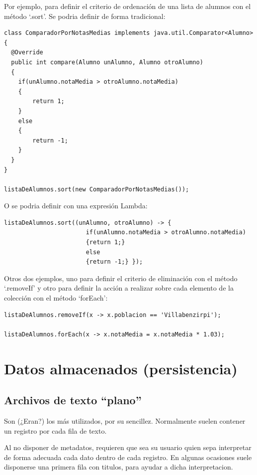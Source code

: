 \documentclass[spanish,12pt,a4paper,final,oneside]{book}
\begin{document}
\begin{footnotesize}
Por ejemplo, para definir el criterio de ordenación de una lista de alumnos con el método `.sort'. Se podria definir de forma tradicional:
\begin{verbatim}
class ComparadorPorNotasMedias implements java.util.Comparator<Alumno>
{
  @Override
  public int compare(Alumno unAlumno, Alumno otroAlumno)
  {
    if(unAlumno.notaMedia > otroAlumno.notaMedia)
    {
        return 1;
    }
    else
    {
        return -1;
    }
  }
}

listaDeAlumnos.sort(new ComparadorPorNotasMedias());
\end{verbatim}
O se podria definir con una expresión Lambda:
\begin{verbatim}
listaDeAlumnos.sort((unAlumno, otroAlumno) -> { 
                       if(unAlumno.notaMedia > otroAlumno.notaMedia)
                       {return 1;}
                       else
                       {return -1;} });
\end{verbatim}

Otros dos ejemplos, uno para definir el criterio de eliminación con el método `.removeIf' y otro para definir la acción a realizar sobre cada elemento de la colección con el método `forEach':
\begin{verbatim}
listaDeAlumnos.removeIf(x -> x.poblacion == 'Villabenzirpi');

listaDeAlumnos.forEach(x -> x.notaMedia = x.notaMedia * 1.03);
\end{verbatim}

\end{footnotesize}


\chapter{Datos almacenados (persistencia)}

\section{Archivos de texto ``plano''}
Son (¿Eran?) los más utilizados, por su sencillez. Normalmente suelen contener un registro por cada fila de texto.

Al no disponer de metadatos, requieren que sea su usuario quien sepa interpretar de forma adecuada cada dato dentro de cada registro. En algunas ocasiones suele disponerse una primera fila con titulos, para ayudar a dicha interpretacion. 
\end{document}
